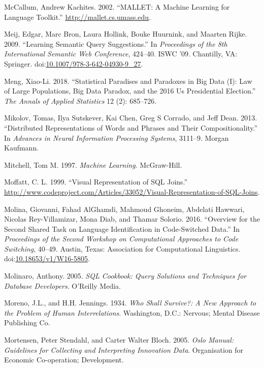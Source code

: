\documentclass[]{krantz}
\begin{document}
\hypertarget{ref-mallet}{}
McCallum, Andrew Kachites. 2002. ``MALLET: A Machine Learning for
Language Toolkit.'' \url{http://mallet.cs.umass.edu}.

\hypertarget{ref-meij-09}{}
Meij, Edgar, Marc Bron, Laura Hollink, Bouke Huurnink, and Maarten
Rijke. 2009. ``Learning Semantic Query Suggestions.'' In
\emph{Proceedings of the 8th International Semantic Web Conference},
424--40. ISWC '09. Chantilly, VA: Springer.
doi:\href{https://doi.org/10.1007/978-3-642-04930-9_27}{10.1007/978-3-642-04930-9\_27}.

\hypertarget{ref-meng2018}{}
Meng, Xiao-Li. 2018. ``Statistical Paradises and Paradoxes in Big Data
(I): Law of Large Populations, Big Data Paradox, and the 2016 Us
Presidential Election.'' \emph{The Annals of Applied Statistics} 12 (2):
685--726.

\hypertarget{ref-mikolov-13}{}
Mikolov, Tomas, Ilya Sutskever, Kai Chen, Greg S Corrado, and Jeff Dean.
2013. ``Distributed Representations of Words and Phrases and Their
Compositionality.'' In \emph{Advances in Neural Information Processing
Systems}, 3111--9. Morgan Kaufmann.

\hypertarget{ref-mitchell1997machine}{}
Mitchell, Tom M. 1997. \emph{Machine Learning}. McGraw-Hill.

\hypertarget{ref-vizjoins}{}
Moffatt, C. L. 1999. ``Visual Representation of SQL Joins.''
\url{http://www.codeproject.com/Articles/33052/Visual-Representation-of-SQL-Joins}.

\hypertarget{ref-molina-16}{}
Molina, Giovanni, Fahad AlGhamdi, Mahmoud Ghoneim, Abdelati Hawwari,
Nicolas Rey-Villamizar, Mona Diab, and Thamar Solorio. 2016. ``Overview
for the Second Shared Task on Language Identification in Code-Switched
Data.'' In \emph{Proceedings of the Second Workshop on Computational
Approaches to Code Switching}, 40--49. Austin, Texas: Association for
Computational Linguistics.
doi:\href{https://doi.org/10.18653/v1/W16-5805}{10.18653/v1/W16-5805}.

\hypertarget{ref-SQLCookbook}{}
Molinaro, Anthony. 2005. \emph{SQL Cookbook: Query Solutions and
Techniques for Database Developers}. O'Reilly Media.

\hypertarget{ref-moreno1934}{}
Moreno, J.L., and H.H. Jennings. 1934. \emph{Who Shall Survive?: A New
Approach to the Problem of Human Interrelations}. Washington, D.C.:
Nervous; Mental Disease Publishing Co.

\hypertarget{ref-oecd2005measurement}{}
Mortensen, Peter Stendahl, and Carter Walter Bloch. 2005. \emph{Oslo
Manual: Guidelines for Collecting and Interpreting Innovation Data}.
Organisation for Economic Co-operation; Development.
\end{document}
